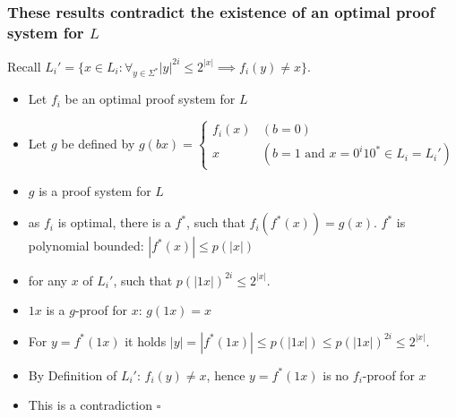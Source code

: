 \begin{frame}
  \frametitle{These results contradict the existence of an optimal proof system for \(L\)}

  Recall \(L_i' = \{ x \in L_i : \forall_{y \in \Sigma^*} |y|^{2i} \leq 2^{|x|} \implies f_i(y) \neq x \}\).

  \begin{itemize}
   \item<1-> Let \(f_i\) be an optimal proof system for \(L\)
   \item<2-> Let \(g\) be defined by
         \(g(bx) =
           \begin{cases}
             f_i(x) & (b=0) \\
             x      & (b = 1 \text{ and } x=0^i10^* \in L_i = L_i') 
           \end{cases}\)
   \item<3-> \(g\) is a proof system for \(L\)
   \item<4-> as \(f_i\) is optimal, there is a \(f^*\), such that \(f_i(f^*(x)) = g(x)\). \(f^*\) is polynomial bounded: \(|f^*(x)| \leq p(|x|)\)
   \item<5-> for any \(x\) of \(L_i'\), such that \(p(|1x|)^{2i} \leq 2^{|x|}\).
   \item<6-> \(1x\) is a \(g\)-proof for \(x\): \(g(1x) = x\)
   \item<7-> For \(y = f^*(1x)\) it holds \(|y| = |f^*(1x)| \leq p(|1x|) \leq p(|1x|)^{2i} \leq 2^{|x|}\).
   \item<8-> By Definition of \(L_i'\): \(f_i(y) \neq x\), hence \(y = f^*(1x)\) is no \(f_i\)-proof for \(x\)
   \item<9-> This is a contradiction  \(\square\)
  \end{itemize}

\end{frame}


